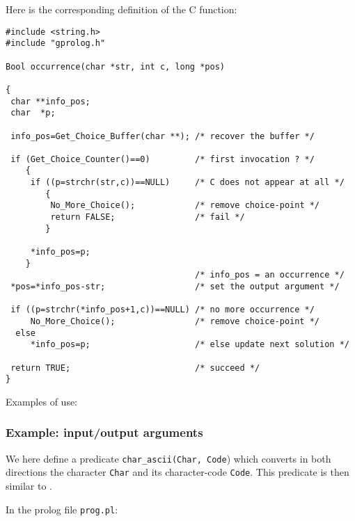 Here is the corresponding definition of the C function:

\begin{Indentation}
\begin{verbatim}
#include <string.h>
#include "gprolog.h"

Bool occurrence(char *str, int c, long *pos)

{
 char **info_pos;
 char  *p;

 info_pos=Get_Choice_Buffer(char **); /* recover the buffer */

 if (Get_Choice_Counter()==0)         /* first invocation ? */
    {
     if ((p=strchr(str,c))==NULL)     /* C does not appear at all */
        {
         No_More_Choice();            /* remove choice-point */
         return FALSE;                /* fail */
        }

     *info_pos=p;
    }
                                      /* info_pos = an occurrence */
 *pos=*info_pos-str;                  /* set the output argument */

 if ((p=strchr(*info_pos+1,c))==NULL) /* no more occurrence */
     No_More_Choice();                /* remove choice-point */
  else
     *info_pos=p;                     /* else update next solution */

 return TRUE;                         /* succeed */
}
\end{verbatim}
\end{Indentation}

Examples of use:

\begin{CodeTwoCols}
\SkipLine
{}
\SkipLine
{}
\SkipLine
{}
\SkipLine
{}
\end{CodeTwoCols}

\subsubsection{Example: input/output arguments}
We here define a predicate \texttt{char\_ascii(Char, Code}) which converts
in both directions the character \texttt{Char} and its character-code
\texttt{Code}. This predicate is then similar to 
.

In the prolog file \texttt{prog.pl}:


